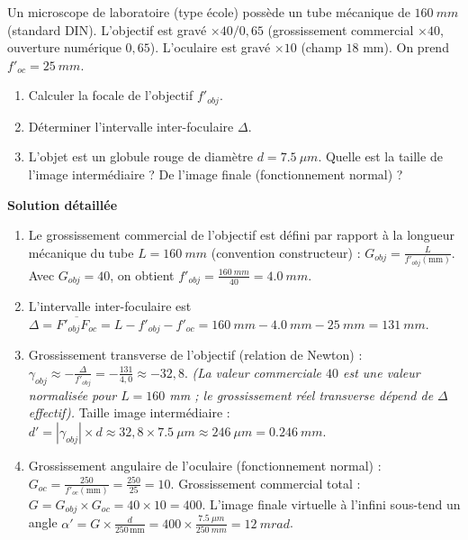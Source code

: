 \documentclass[11pt]{article}
\begin{document}
\begin{exoresolu}
Un microscope de laboratoire (type école) possède un tube mécanique de $\SI{160}{mm}$ (standard DIN). L'objectif est gravé $\times 40 / 0,65$ (grossissement commercial $\times 40$, ouverture numérique $0,65$). L'oculaire est gravé $\times 10$ (champ $18$ mm). On prend $f'_{oc} = \SI{25}{mm}$.
\begin{enumerate}
    \item Calculer la focale de l'objectif $f'_{obj}$.
    \item Déterminer l'intervalle inter-foculaire $\Delta$.
    \item L'objet est un globule rouge de diamètre $d = \SI{7,5}{\mu m}$. Quelle est la taille de l'image intermédiaire ? De l'image finale (fonctionnement normal) ?
\end{enumerate}
\textbf{Solution détaillée}
\begin{enumerate}
    \item Le grossissement commercial de l'objectif est défini par rapport à la longueur mécanique du tube $L = \SI{160}{mm}$ (convention constructeur) : $G_{obj} = \frac{L}{f'_{obj}(\text{mm})}$. Avec $G_{obj} = 40$, on obtient $f'_{obj} = \frac{\SI{160}{mm}}{40} = \SI{4,0}{mm}$.
    \item L'intervalle inter-foculaire est $\Delta = \overline{F'_{obj}F_{oc}} = L - f'_{obj} - f'_{oc} = \SI{160}{mm} - \SI{4,0}{mm} - \SI{25}{mm} = \SI{131}{mm}$.
    \item Grossissement transverse de l'objectif (relation de Newton) : $\gamma_{obj} \approx -\frac{\Delta}{f'_{obj}} = -\frac{131}{4,0} \approx -32,8$. \textit{(La valeur commerciale $40$ est une valeur normalisée pour $L=160$ mm ; le grossissement réel transverse dépend de $\Delta$ effectif).} Taille image intermédiaire : $d' = |\gamma_{obj}| \times d \approx 32,8 \times \SI{7,5}{\mu m} \approx \SI{246}{\mu m} = \SI{0,246}{mm}$.
    \item Grossissement angulaire de l'oculaire (fonctionnement normal) : $G_{oc} = \frac{250}{f'_{oc}(\text{mm})} = \frac{250}{25} = 10$. Grossissement commercial total : $G = G_{obj} \times G_{oc} = 40 \times 10 = 400$. L'image finale virtuelle à l'infini sous-tend un angle $\alpha' = G \times \frac{d}{250\,\text{mm}} = 400 \times \frac{\SI{7,5}{\mu m}}{\SI{250}{mm}} = \SI{12}{mrad}$.
\end{enumerate}
\end{exoresolu}
\end{document}
